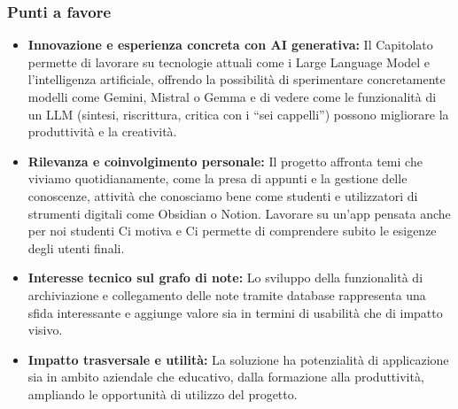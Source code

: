 \documentclass[a4paper,12pt]{article}
\begin{document}
\subsubsection{Punti a favore}
\begin{itemize}
    \item \textbf{Innovazione e esperienza concreta con AI generativa:} Il Capitolato permette di lavorare su tecnologie attuali come i Large Language Model e l’intelligenza artificiale, offrendo la possibilità di sperimentare concretamente modelli come Gemini, Mistral o Gemma e di vedere come le funzionalità di un LLM (sintesi, riscrittura, critica con i “sei cappelli”) possono migliorare la produttività e la creatività.
    \item \textbf{Rilevanza e coinvolgimento personale:} Il progetto affronta temi che viviamo quotidianamente, come la presa di appunti e la gestione delle conoscenze, attività che conosciamo bene come studenti e utilizzatori di strumenti digitali come Obsidian o Notion. Lavorare su un’app pensata anche per noi studenti Ci motiva e Ci permette di comprendere subito le esigenze degli utenti finali.
    \item \textbf{Interesse tecnico sul grafo di note:} Lo sviluppo della funzionalità di archiviazione e collegamento delle note tramite database rappresenta una sfida interessante e aggiunge valore sia in termini di usabilità che di impatto visivo.
    \item \textbf{Impatto trasversale e utilità:} La soluzione ha potenzialità di applicazione sia in ambito aziendale che educativo, dalla formazione alla produttività, ampliando le opportunità di utilizzo del progetto.
\end{itemize}
\end{document}
